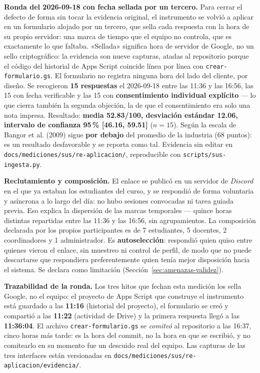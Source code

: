 \textbf{Ronda del 2026-09-18 con fecha sellada por un tercero.} Para cerrar el defecto de forma sin
tocar la evidencia original, el instrumento se volvió a aplicar en un formulario alojado por un
tercero, que sella cada respuesta con la hora de su propio servidor: una marca de tiempo que el equipo
no controla, que es exactamente lo que faltaba. «Sellada» significa hora de servidor de Google, no un
sello criptográfico: la evidencia son nueve capturas, atadas al repositorio porque el código del
historial de Apps Script coincide línea por línea con \texttt{crear-formulario.gs}. El formulario no registra ninguna hora del lado del
cliente, por diseño. Se recogieron \textbf{15 respuestas} el 2026-09-18 entre las 11:36 y las 16:56, las
15 con fecha verificable y las 15 con \textbf{consentimiento individual explícito} --- lo que cierra
también la segunda objeción, la de que el consentimiento era solo una nota impresa. Resultado:
\textbf{media 52.83/100, desviación estándar 12.06, intervalo de confianza 95\,\% [46.16, 59.51]}
($n=15$). Según la escala de Bangor et al. (2009) sigue \textbf{por debajo} del promedio de la industria
(68 puntos): es un resultado desfavorable y se reporta como tal. Evidencia sin editar en
\texttt{docs/mediciones/sus/re-aplicacion/}, reproducible con \texttt{scripts/sus-ingesta.py}.

\textbf{Reclutamiento y composición.} El enlace se publicó en un servidor de \emph{Discord} en el que
ya estaban los estudiantes del curso, y se respondió de forma voluntaria y asíncrona a lo largo del
día: no hubo sesiones convocadas ni tarea guiada previa. Eso explica la dispersión de las marcas
temporales --- quince horas distintas repartidas entre las 11:36 y las 16:56, sin agrupamientos. La
composición declarada por los propios participantes es de 7 estudiantes, 5 docentes, 2 coordinadores y
1 administrador. Es \textbf{autoselección}: respondió quien quiso entre quienes vieron el enlace, sin
muestreo ni control de perfil, de modo que no puede descartarse que respondiera preferentemente quien
tenía mejor disposición hacia el sistema. Se declara como limitación
(Sección~\ref{sec:amenazas-validez}).

\textbf{Trazabilidad de la ronda.} Los tres hitos que fechan esta medición los sella Google, no el
equipo: el proyecto de Apps Script que construye el instrumento está guardado a las \textbf{11:16}
(historial del proyecto), el formulario se creó y compartió a las \textbf{11:22} (actividad de Drive)
y la primera respuesta llegó a las \textbf{11:36:04}. El archivo \texttt{crear-formulario.gs} se
\emph{comiteó} al repositorio a las 16:37, cinco horas más tarde: es la hora del commit, no la hora en
que se escribió, y no comitearlo en su momento fue un descuido real del equipo. Las capturas de las
tres interfaces están versionadas en
\texttt{docs/mediciones/sus/re-aplicacion/evidencia/}.

